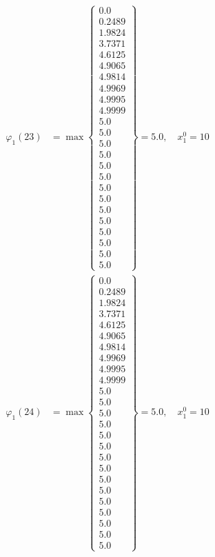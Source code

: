 \documentclass{article}
\begin{document}
\begin{align*}
\varphi_{1}(23) &= \max \left\{ \begin{array}{c}
0.0 \\
 0.2489 \\
 1.9824 \\
 3.7371 \\
 4.6125 \\
 4.9065 \\
 4.9814 \\
 4.9969 \\
 4.9995 \\
 4.9999 \\
 5.0 \\
 5.0 \\
 5.0 \\
 5.0 \\
 5.0 \\
 5.0 \\
 5.0 \\
 5.0 \\
 5.0 \\
 5.0 \\
 5.0 \\
 5.0 \\
 5.0 \\
 5.0
\end{array} \right\}=5.0, \quad x_{1}^0=10\\
  
\varphi_{1}(24) &= \max \left\{ \begin{array}{c}
0.0 \\
 0.2489 \\
 1.9824 \\
 3.7371 \\
 4.6125 \\
 4.9065 \\
 4.9814 \\
 4.9969 \\
 4.9995 \\
 4.9999 \\
 5.0 \\
 5.0 \\
 5.0 \\
 5.0 \\
 5.0 \\
 5.0 \\
 5.0 \\
 5.0 \\
 5.0 \\
 5.0 \\
 5.0 \\
 5.0 \\
 5.0 \\
 5.0 \\
 5.0
\end{array} \right\}=5.0, \quad x_{1}^0=10\\
  

\end{align*}
\end{document}
